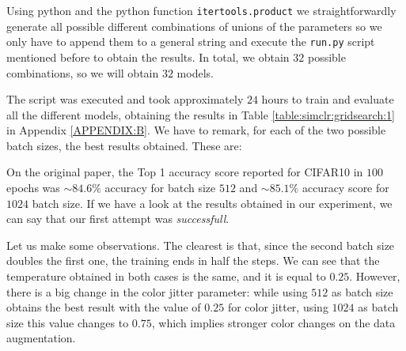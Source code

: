 Using python and the python function \lstinline{itertools.product} we straightforwardly generate all possible different combinations of unions of the parameters so we only have to append them to a general string and execute the \lstinline{run.py} script mentioned before to obtain the results. In total, we obtain $32$ possible combinations, so we will obtain $32$ models. 

The script was executed and took approximately $24$ hours to train and evaluate all the different models, obtaining the results in Table \ref{table:simclr:gridsearch:1} in Appendix \ref{APPENDIX:B}. We have to remark, for each of the two possible batch sizes, the best results obtained. These are:

\begin{table}[H]
    \label{table:best:first:simclr}
\centering
{}
\caption{Best results for the grid search experiment with SimCLR.}
\end{table}

\begin{remark}
On the original paper, the Top 1 accuracy score reported for CIFAR10 in $100$ epochs was $\sim 84.6\%$ accuracy for batch size $512$ and $\sim 85.1 \%$ accuracy score for $1024$ batch size. If we have a look at the results obtained in our experiment, we can say that our first attempt was \emph{successfull}.
\end{remark}

Let us make some observations. The clearest is that, since the second batch size doubles the first one, the training ends in half the steps. We can see that the temperature obtained in both cases is the same, and it is equal to $0.25$. However, there is a big change in the color jitter parameter: while using $512$ as batch size obtains the best result with the value of $0.25$ for color jitter, using $1024$ as batch size this value changes to $0.75$, which implies stronger color changes on the data augmentation. 

